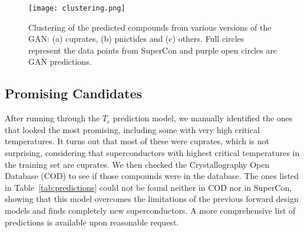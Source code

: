 \begin{figure*}
    \centering
\vspace{-2cm}
\texttt{[image: clustering.png]}
\vspace{-2cm}
    \caption{Clustering of the predicted compounds 
from various versions of the GAN: (a) cuprates, (b) pnictides and (c) others.
Full circles represent the data points from SuperCon and purple open circles are GAN
predictions.}
    \label{fig:tsne}
\end{figure*}

\subsection{Promising Candidates}

After running through the $T_c$ prediction model, we manually identified the ones that looked the most promising, including some with very high critical temperatures. It turns out that most of these were cuprates, which is not surprising, considering that superconductors with highest critical temperatures in the training set are cuprates. We then checked the Crystallography Open Database (COD) \cite{Vaitkus2021} to see if those compounds were in the database. The ones listed in Table~\ref{tab:predictions} could not be found neither in COD nor in SuperCon, showing that this model overcomes the limitations of the previous forward design models and finds completely new superconductors. A more comprehensive list of predictions is available upon reasonable request.

